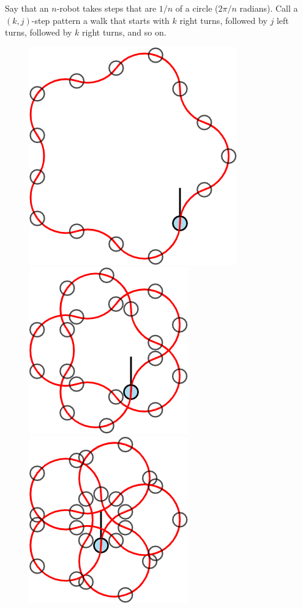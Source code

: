 \documentclass{article}
\begin{document}
Say that an $n$-robot takes steps that are $1/n$ of a circle ($2\pi/n$ radians).
Call a $(k, j)$-step pattern a walk that starts with $k$ right turns, followed
by $j$ left turns, followed by $k$ right turns, and so on.
\begin{figure}[ht!]
  \centering
  \includegraphics[scale=0.2]{assets/robot_walks/079_problem_5-robot_1_2.png}
  \includegraphics[scale=0.2]{assets/robot_walks/079_problem_5-robot_1_3.png}
  \includegraphics[scale=0.2]{assets/robot_walks/079_problem_5-robot_1_4.png}

\end{figure}
\end{document}
